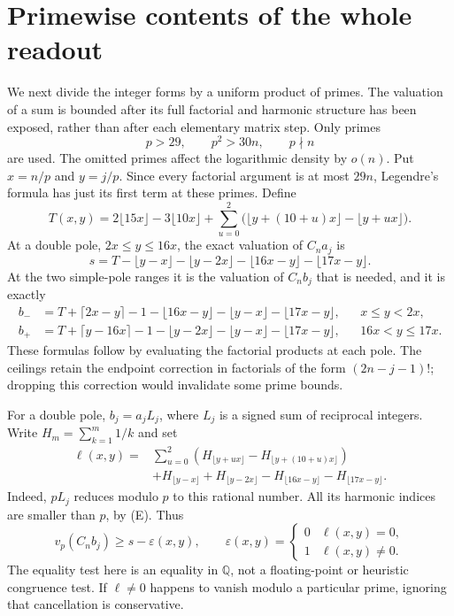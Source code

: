 \section{Primewise contents of the whole readout}
We next divide the integer forms by a uniform product of primes. The
valuation of a sum is bounded after its full factorial and harmonic
structure has been exposed, rather than after each elementary matrix step.
Only primes
\[
 p>29,\qquad p^2>30n,\qquad p\nmid n
 \tag{E}
\]
are used. The omitted primes affect the logarithmic density by $o(n)$.
Put $x=n/p$ and $y=j/p$. Since every factorial argument is at most $29n$,
Legendre's formula has just its first term at these primes.
Define
\[
 T(x,y)=2\lfloor15x\rfloor-3\lfloor10x\rfloor+
 \sum_{u=0}^2\bigl(\lfloor y+(10+u)x\rfloor-\lfloor y+ux\rfloor\bigr).
\]
At a double pole, $2x\le y\le16x$, the exact valuation of $C_na_j$ is
\[
 s=T-\lfloor y-x\rfloor-\lfloor y-2x\rfloor
        -\lfloor16x-y\rfloor-\lfloor17x-y\rfloor.
 \tag{D}
\]
At the two simple-pole ranges it is the valuation of $C_nb_j$ that is
needed, and it is exactly
\begin{align*}
 b_-&=T+\lceil2x-y\rceil-1-\lfloor16x-y\rfloor
                   -\lfloor y-x\rfloor-\lfloor17x-y\rfloor,
           &&x\le y<2x,\\
 b_+&=T+\lceil y-16x\rceil-1-\lfloor y-2x\rfloor
                   -\lfloor y-x\rfloor-\lfloor17x-y\rfloor,
           &&16x<y\le17x.
\end{align*}
These formulas follow by evaluating the factorial products at each pole.
The ceilings retain the endpoint correction in factorials of the form
$(2n-j-1)!$; dropping this correction would invalidate some prime bounds.

For a double pole, $b_j=a_jL_j$, where $L_j$ is a signed sum of reciprocal
integers. Write $H_m=\sum_{k=1}^m1/k$ and set
\begin{align*}
 \ell(x,y)={}&\sum_{u=0}^2\left(H_{\lfloor y+ux\rfloor}
                           -H_{\lfloor y+(10+u)x\rfloor}\right)\\
 &+H_{\lfloor y-x\rfloor}+H_{\lfloor y-2x\rfloor}
  -H_{\lfloor16x-y\rfloor}-H_{\lfloor17x-y\rfloor}.
\end{align*}
Indeed, $pL_j$ reduces modulo $p$ to this rational number. All its
harmonic indices are smaller than $p$, by (E). Thus
\[
 v_p(C_nb_j)\ge s-\varepsilon(x,y),\qquad
 \varepsilon(x,y)=\begin{cases}0&\ell(x,y)=0,\\1&\ell(x,y)\ne0.\end{cases}
 \tag{LD}
\]
The equality test here is an equality in $\mathbb Q$, not a floating-point
or heuristic congruence test. If $\ell\ne0$ happens to vanish modulo a
particular prime, ignoring that cancellation is conservative.

